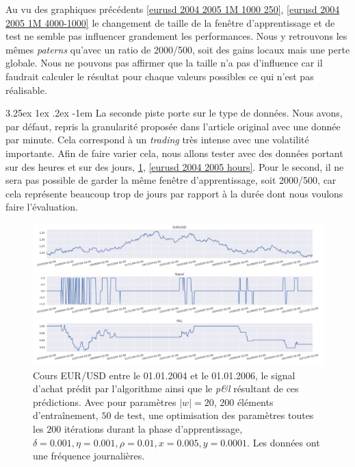 \documentclass[a4paper, 11pt]{article}
\makeatletter
\renewcommand\paragraph{\@startsection{paragraph}{5}{\z@}%
  {3.25ex \@plus1ex \@minus.2ex}%
  {-1em}%
  {\normalfont\normalsize\bfseries}}
\makeatother
\begin{document}
Au vu des graphiques précédents \ref{eurusd 2004 2005 1M 1000 250}, \ref{eurusd 2004 2005 1M 4000-1000} le changement de taille de la fenêtre d'apprentissage et de test ne semble pas influencer grandement les performances. Nous y retrouvons les mêmes \textit{paterns} qu'avec un ratio de 2000/500, soit des gains locaux mais une perte globale. Nous ne pouvons pas affirmer que la taille n'a pas d'influence car il faudrait calculer le résultat pour chaque valeurs possibles ce qui n'est pas réalisable.

\paragraph{}
La seconde piste porte sur le type de données. Nous avons, par défaut, repris la granularité proposée dans l'article original avec une donnée par minute. Cela correspond à un \textit{trading} très intense avec une volatilité importante. Afin de faire varier cela, nous allons tester avec des données portant sur des heures et sur des jours, \ref{eurusd 2004 2005 days}, \ref{eurusd 2004 2005 hours}. Pour le second, il ne sera pas possible de garder la même fenêtre d'apprentissage, soit 2000/500, car cela représente beaucoup trop de jours par rapport à la durée dont nous voulons faire l'évaluation.

\begin{figure}
	\centering
	\includegraphics[scale=0.5]{res/eursud_2004-2005-days}
	\caption{Cours EUR/USD entre le 01.01.2004 et le 01.01.2006, le signal d'achat prédit par l'algorithme ainsi que le \textit{p\&l} résultant de ces prédictions. Avec pour paramètres $|w| = 20$, $200$ éléments d'entraînement, $50$ de test, une optimisation des
		paramètres toutes les $200$ itérations durant la phase d'apprentissage, $\delta = 0.001, \eta=0.001,\rho=0.01, x = 0.005, y=0.0001$. Les données ont une fréquence journalières.}
	\label{eurusd 2004 2005 days}
\end{figure}
\end{document}
